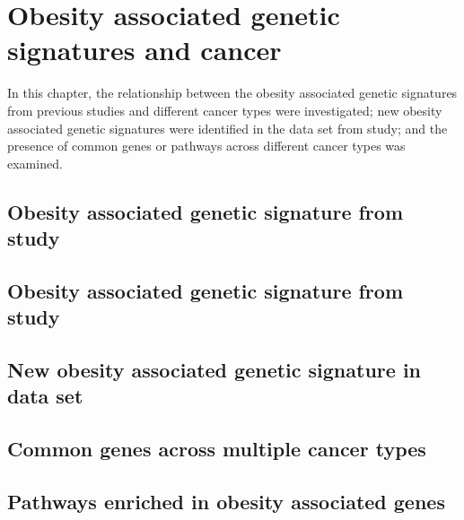 \chapter{Obesity associated genetic signatures and cancer}
\label{cha:obesity_genetic_signatures_and_cancer}

In this chapter, the relationship between the obesity associated genetic signatures from previous studies and different cancer types were investigated; new obesity associated genetic signatures were identified in the data set from \citet{Creighton2012} study; and the presence of common genes or pathways across different cancer types was examined.

\section{Obesity associated genetic signature from \citet{Creighton2012} study}
\label{sec:creighton_obesity_metagene}










\section{Obesity associated genetic signature from \citet{Fuentes-Mattei2014} study}
\label{sec:fm_obesity_metagene}










\section{New obesity associated genetic signature in \citet{Creighton2012} data set}
\label{sec:creighton_obesity_metagene_new}










\section{Common genes across multiple cancer types}
\label{sec:common_genes_across_multiple_cancer_types}










\section{Pathways enriched in obesity associated genes}
\label{sec:pathways_enriched_in_obesity_associated_genes}












